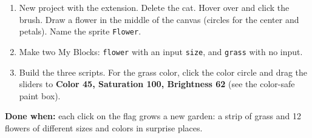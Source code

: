 \begin{exercise}
\begin{enumerate}[leftmargin=1.4em,itemsep=1pt]
  \item New project with the  extension. Delete the cat. Hover over  and click the  brush. Draw a flower in the middle of the canvas (circles for the center and petals). Name the sprite \texttt{Flower}.
  \item Make two My Blocks: \texttt{flower} with an input \texttt{size}, and \texttt{grass} with no input.
  \item Build the three scripts. For the grass color, click the color circle and drag the sliders to \textbf{Color 45, Saturation 100, Brightness 62} (see the color-safe paint box).
\end{enumerate}
\begin{center}
\begin{scratch}[scale=0.72]
\end{scratch}
\hspace{0.4cm}
\begin{scratch}[scale=0.72]
\end{scratch}

\medskip
\begin{scratch}[scale=0.72]
\end{scratch}
\end{center}
\textbf{Done when:} each click on the flag grows a new garden: a strip of grass and 12 flowers of different sizes and colors in surprise places.
\end{exercise}

